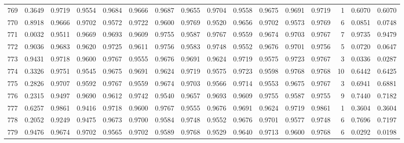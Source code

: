 \begin{tabular}{lrrrrrrrrrrrrrrr}
769 &      0.3649 &  0.9719 &  0.9554 &  0.9684 &  0.9666 &  0.9687 &  0.9655 &  0.9704 &  0.9558 &  0.9675 &   0.9691 &     0.9719 &      1 &                    0.6070 &                     0.6070 \\
770 &      0.8918 &  0.9666 &  0.9702 &  0.9572 &  0.9722 &  0.9600 &  0.9769 &  0.9520 &  0.9656 &  0.9702 &   0.9573 &     0.9769 &      6 &                    0.0851 &                     0.0748 \\
771 &      0.0032 &  0.9511 &  0.9669 &  0.9693 &  0.9609 &  0.9755 &  0.9587 &  0.9767 &  0.9559 &  0.9674 &   0.9703 &     0.9767 &      7 &                    0.9735 &                     0.9479 \\
772 &      0.9036 &  0.9683 &  0.9620 &  0.9725 &  0.9611 &  0.9756 &  0.9583 &  0.9748 &  0.9552 &  0.9676 &   0.9701 &     0.9756 &      5 &                    0.0720 &                     0.0647 \\
773 &      0.9431 &  0.9718 &  0.9600 &  0.9767 &  0.9555 &  0.9676 &  0.9691 &  0.9624 &  0.9719 &  0.9575 &   0.9723 &     0.9767 &      3 &                    0.0336 &                     0.0287 \\
774 &      0.3326 &  0.9751 &  0.9545 &  0.9675 &  0.9691 &  0.9624 &  0.9719 &  0.9575 &  0.9723 &  0.9598 &   0.9768 &     0.9768 &     10 &                    0.6442 &                     0.6425 \\
775 &      0.2826 &  0.9707 &  0.9592 &  0.9767 &  0.9559 &  0.9674 &  0.9703 &  0.9566 &  0.9714 &  0.9553 &   0.9675 &     0.9767 &      3 &                    0.6941 &                     0.6881 \\
776 &      0.2315 &  0.9497 &  0.9690 &  0.9612 &  0.9742 &  0.9540 &  0.9657 &  0.9693 &  0.9609 &  0.9755 &   0.9587 &     0.9755 &      9 &                    0.7440 &                     0.7182 \\
777 &      0.6257 &  0.9861 &  0.9416 &  0.9718 &  0.9600 &  0.9767 &  0.9555 &  0.9676 &  0.9691 &  0.9624 &   0.9719 &     0.9861 &      1 &                    0.3604 &                     0.3604 \\
778 &      0.2052 &  0.9249 &  0.9475 &  0.9673 &  0.9700 &  0.9584 &  0.9748 &  0.9552 &  0.9676 &  0.9701 &   0.9577 &     0.9748 &      6 &                    0.7696 &                     0.7197 \\
779 &      0.9476 &  0.9674 &  0.9702 &  0.9565 &  0.9702 &  0.9589 &  0.9768 &  0.9529 &  0.9640 &  0.9713 &   0.9600 &     0.9768 &      6 &                    0.0292 &                     0.0198 \\

\end{tabular}
